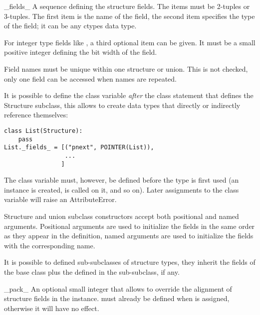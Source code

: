 \begin{memberdesc}{_fields_}
A sequence defining the structure fields.  The items must be
2-tuples or 3-tuples.  The first item is the name of the field,
the second item specifies the type of the field; it can be any
ctypes data type.

For integer type fields like , a third optional item can
be given.  It must be a small positive integer defining the bit
width of the field.

Field names must be unique within one structure or union.  This is
not checked, only one field can be accessed when names are
repeated.

It is possible to define the  class variable \emph{after}
the class statement that defines the Structure subclass, this
allows to create data types that directly or indirectly reference
themselves:
\begin{verbatim}
class List(Structure):
    pass
List._fields_ = [("pnext", POINTER(List)),
                 ...
                ]
\end{verbatim}

The  class variable must, however, be defined before
the type is first used (an instance is created,  is
called on it, and so on).  Later assignments to the 
class variable will raise an AttributeError.

Structure and union subclass constructors accept both positional
and named arguments.  Positional arguments are used to initialize
the fields in the same order as they appear in the 
definition, named arguments are used to initialize the fields with
the corresponding name.

It is possible to defined sub-subclasses of structure types, they
inherit the fields of the base class plus the  defined
in the sub-subclass, if any.
\end{memberdesc}

\begin{memberdesc}{_pack_}
An optional small integer that allows to override the alignment of
structure fields in the instance.   must already be
defined when  is assigned, otherwise it will have no
effect.
\end{memberdesc}

